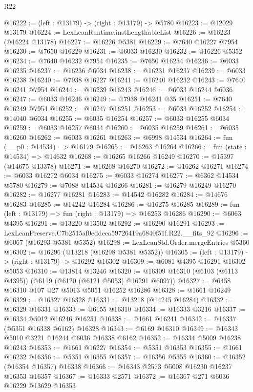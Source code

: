 \begin{lexlean}{R22}
\begin{coremodule}
@16222 := (left : @13179) -> (right : @13179) -> @5780
@16223 := @12029 @13179
@16224 := LexLeanRuntime.instLengthableList
@16226 := @16223 (@16224 @13178)
@16227 := @16226 @5381
@16229 := @7640 @16227 @7954
@16230 := @7650 @16229
@16231 := @6033 @16230
@16232 := @16226 @5352
@16234 := @7640 @16232 @7954
@16235 := @7650 @16234
@16236 := @6033 @16235
@16237 := @16236 @6034
@16238 := @16231 @16237
@16239 := @6033 @16238
@16240 := @7938 @16227
@16241 := @16240 @16232
@16243 := @7640 @16241 @7954
@16244 := @16239 @16243
@16246 := @6033 @16244 @6036
@16247 := @6033 @16246
@16249 := @7938 @16241 @35
@16251 := @7640 @16249 @7954
@16252 := @16247 @16251
@16253 := @6033 @16252
@16254 := @14040 @6034
@16255 := @6035 @16254
@16257 := @6033 @16255 @6034
@16259 := @6033 @16257 @6034
@16260 := @6035 @16259
@16261 := @6035 @16260
@16262 := @6033 @16261
@16263 := @6998 @14534
@16264 := fun (__p0 : @14534) => @16179
@16265 := @16263 @16264
@16266 := fun (state : @14534) => @14632
@16268 := @16265 @16266 @16249
@16270 := @15397 (@14675 @13378)
@16271 := @16268 @16270
@16272 := @16262 @16271
@16274 := @6033 @16272 @6034
@16275 := @6033 @16274
@16277 := @6362 @14534 @5780
@16279 := @7088 @14534 @16266
@16281 := @16279 @16249 @16270
@16282 := @16277 @16281
@16283 := @14542 @16282
@16284 := @14676 @16283
@16285 := @14242 @16284
@16286 := @16275 @16285
@16289 := fun (left : @13179) => fun (right : @13179) => @16253 @16286
@16290 := @6063 @4395
@16291 := @13220 @13502
@16292 := @16290 @16291
@16293 := LexLeanPreserve.C7b2515af0eddeea59726419a6840f51f.R22.__fits_92
@16296 := @6067 (@16293 @5381 @5352)
@16298 := LexLeanStd.Order.mergeEntries @5360
@16302 := @16296 (@13218 (@16298 @5381 @5352))
@16305 := (left : @13179) -> (right : @13179) -> @16292 @16302
@16309 := @6081 @4395 @16291 @16302 @5053
@16310 := @13814 @13246
@16320 := @16309 @16310 (@6103 (@6113 @4395)) (@6119 (@6120 (@6121 @5053) @16291 @6097))
@16327 := @6458 @16310 @107 @27 @5013 @5051 @16252 @16286
@16328 := @1661 @16249
@16329 := @16327 @16328
@16331 := @13218 (@14245 @16284)
@16332 := @16329 @16331
@16333 := @6155 @16310
@16334 := @16333 @3216
@16337 := @16334 @5012 @16246 @16251
@16338 := @1661 @16241
@16342 := @16337 (@5351 @16338 @6162) @16328
@16343 := @6169 @16310
@16349 := @16343 @5010 @3221 @16244 @6036 @16338 @6162
@16352 := @16334 @5009 @16238 @16243
@16353 := @1661 @16227
@16354 := @5351 @16353
@16355 := @1661 @16232
@16356 := @5351 @16355
@16357 := @16356 @5355
@16360 := @16352 (@16354 @16357) @16338
@16366 := @16343 @2573 @5008 @16230 @16237 @16353 @16357
@16367 := @16333 @2571
@16372 := @16367 @271 @6036 @16229 @13629 @16353

\end{coremodule}
\end{lexlean}

